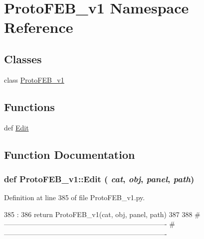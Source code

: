 \hypertarget{namespaceProtoFEB__v1}{
\section{ProtoFEB\_\-v1 Namespace Reference}
\label{namespaceProtoFEB__v1}
}
\subsection*{Classes}
\begin{DoxyCompactItemize}
\item 
class \hyperlink{classProtoFEB__v1_1_1ProtoFEB__v1}{ProtoFEB\_\-v1}
\end{DoxyCompactItemize}
\subsection*{Functions}
\begin{DoxyCompactItemize}
\item 
def \hyperlink{namespaceProtoFEB__v1_a6bfbb78973c41eb635d3bff95886a4f4}{Edit}
\end{DoxyCompactItemize}


\subsection{Function Documentation}
\hypertarget{namespaceProtoFEB__v1_a6bfbb78973c41eb635d3bff95886a4f4}{
\subsubsection[{Edit}]{\setlength{\rightskip}{0pt plus 5cm}def ProtoFEB\_\-v1::Edit ( {\em cat}, \/   {\em obj}, \/   {\em panel}, \/   {\em path})}}
\label{namespaceProtoFEB__v1_a6bfbb78973c41eb635d3bff95886a4f4}


Definition at line 385 of file ProtoFEB\_\-v1.py.


\begin{DoxyCode}
385                                 :
386     return ProtoFEB_v1(cat, obj, panel, path)
387 
388 #----------------------------------------------------------------------
#----------------------------------------------------------------------
\end{DoxyCode}
